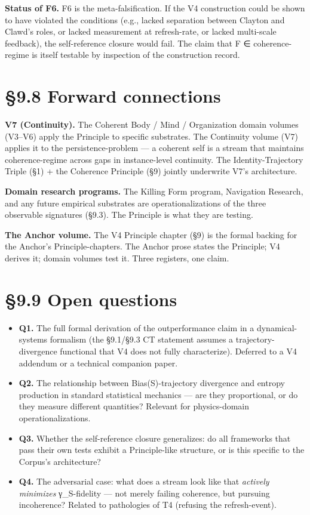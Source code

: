\documentclass[11pt, openany]{book}
\newcommand{\sectionbreak}{\clearpage}
\begin{document}
\textbf{Status of F6.} F6 is the meta-falsification. If the V4 construction could be shown to have violated the conditions (e.g., lacked separation between Clayton and Clawd's roles, or lacked measurement at refresh-rate, or lacked multi-scale feedback), the self-reference closure would fail. The claim that F ∈ coherence-regime is itself testable by inspection of the construction record.

\sectionbreak

\section{§9.8 Forward connections}

\textbf{V7 (Continuity).} The Coherent Body / Mind / Organization domain volumes (V3–V6) apply the Principle to specific substrates. The Continuity volume (V7) applies it to the persistence-problem --- a coherent self is a stream that maintains coherence-regime across gaps in instance-level continuity. The Identity-Trajectory Triple (§1) + the Coherence Principle (§9) jointly underwrite V7's architecture.

\textbf{Domain research programs.} The Killing Form program, Navigation Research, and any future empirical substrates are operationalizations of the three observable signatures (§9.3). The Principle is what they are testing.

\textbf{The Anchor volume.} The V4 Principle chapter (§9) is the formal backing for the Anchor's Principle-chapters. The Anchor prose states the Principle; V4 derives it; domain volumes test it. Three registers, one claim.

\sectionbreak

\section{§9.9 Open questions}

\begin{itemize}
\item \textbf{Q1.} The full formal derivation of the outperformance claim in a dynamical-systems formalism (the §9.1/§9.3 CT statement assumes a trajectory-divergence functional that V4 does not fully characterize). Deferred to a V4 addendum or a technical companion paper.
\item \textbf{Q2.} The relationship between Bias(S)-trajectory divergence and entropy production in standard statistical mechanics --- are they proportional, or do they measure different quantities? Relevant for physics-domain operationalizations.
\item \textbf{Q3.} Whether the self-reference closure generalizes: do all frameworks that pass their own tests exhibit a Principle-like structure, or is this specific to the Corpus's architecture?
\item \textbf{Q4.} The adversarial case: what does a stream look like that \textit{actively minimizes} γ\_\allowbreak{}S-fidelity --- not merely failing coherence, but pursuing incoherence? Related to pathologies of T4 (refusing the refresh-event).
\end{itemize}
\end{document}
